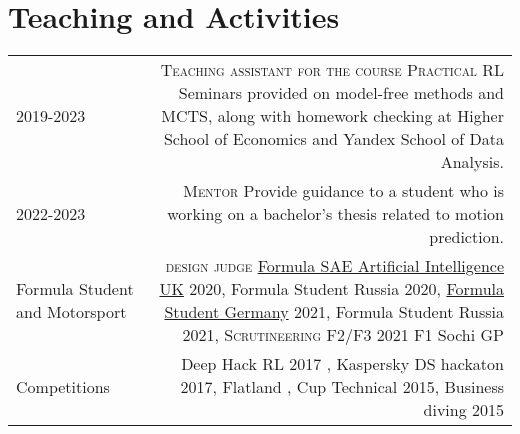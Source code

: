 \section*{\sectionformat Teaching and Activities}
\begin{tabular}{@{}L!{\VRule}R}
2019-2023  {} &
{\textsc{Teaching assistant for the course Practical RL}} Seminars provided on model-free methods and MCTS, along with homework checking at Higher School of Economics and Yandex School of Data Analysis.
\\
2022-2023 {} 
& {\textsc{Mentor}} Provide guidance to a student who is working on a bachelor's thesis related to motion prediction.
\\
Formula Student and Motorsport &
{\textsc{design judge}} \href{https://www.imeche.org/events/formula-student/team-information/fs-ai}{Formula SAE Artificial Intelligence UK} 2020, Formula Student Russia 2020, \href{https://www.formulastudent.de/fsg/}{Formula Student Germany} 2021, Formula Student Russia 2021,
{\textsc{Scrutineering F2/F3}} 2021 F1 Sochi GP
\\
Competitions                   &
Deep Hack RL 2017 ,
Kaspersky DS hackaton 2017,
Flatland ,
Cup Technical 2015,
Business diving 2015
\end{tabular}
